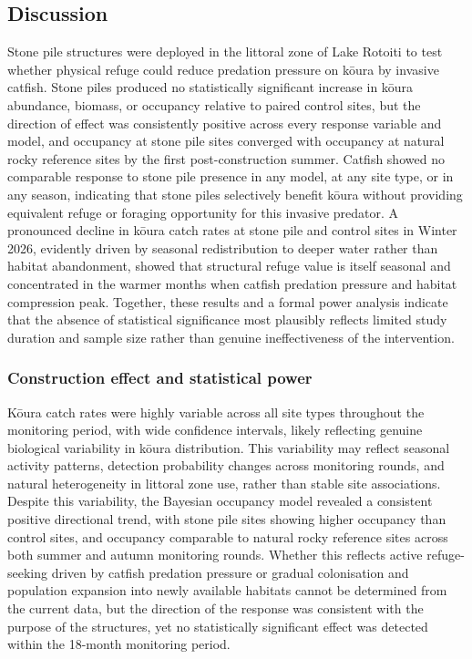 \documentclass[
  letterpaper,
  DIV=11,
  numbers=noendperiod]{scrartcl}
\begin{document}
\subsection{Discussion}\label{discussion}

Stone pile structures were deployed in the littoral zone of Lake Rotoiti
to test whether physical refuge could reduce predation pressure on kōura
by invasive catfish. Stone piles produced no statistically significant
increase in kōura abundance, biomass, or occupancy relative to paired
control sites, but the direction of effect was consistently positive
across every response variable and model, and occupancy at stone pile
sites converged with occupancy at natural rocky reference sites by the
first post-construction summer. Catfish showed no comparable response to
stone pile presence in any model, at any site type, or in any season,
indicating that stone piles selectively benefit kōura without providing
equivalent refuge or foraging opportunity for this invasive predator. A
pronounced decline in kōura catch rates at stone pile and control sites
in Winter 2026, evidently driven by seasonal redistribution to deeper
water rather than habitat abandonment, showed that structural refuge
value is itself seasonal and concentrated in the warmer months when
catfish predation pressure and habitat compression peak. Together, these
results and a formal power analysis indicate that the absence of
statistical significance most plausibly reflects limited study duration
and sample size rather than genuine ineffectiveness of the intervention.

\subsubsection{Construction effect and statistical
power}\label{construction-effect-and-statistical-power}

Kōura catch rates were highly variable across all site types throughout
the monitoring period, with wide confidence intervals, likely reflecting
genuine biological variability in kōura distribution. This variability
may reflect seasonal activity patterns, detection probability changes
across monitoring rounds, and natural heterogeneity in littoral zone
use, rather than stable site associations. Despite this variability, the
Bayesian occupancy model revealed a consistent positive directional
trend, with stone pile sites showing higher occupancy than control
sites, and occupancy comparable to natural rocky reference sites across
both summer and autumn monitoring rounds. Whether this reflects active
refuge-seeking driven by catfish predation pressure or gradual
colonisation and population expansion into newly available habitats
cannot be determined from the current data, but the direction of the
response was consistent with the purpose of the structures, yet no
statistically significant effect was detected within the 18-month
monitoring period.
\end{document}
